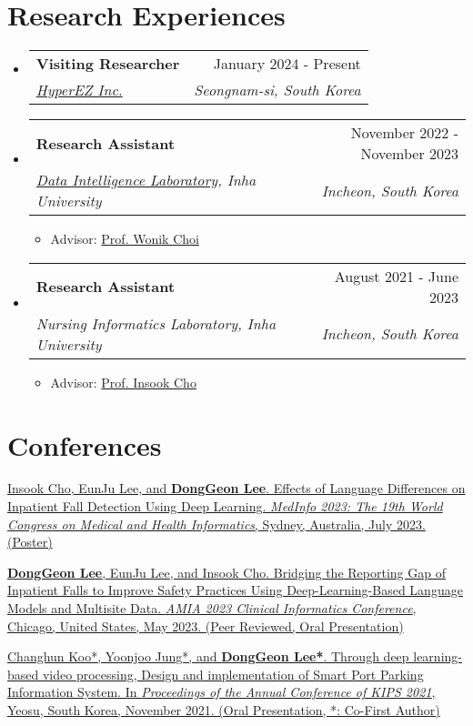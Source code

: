 \documentclass[letterpaper,11pt]{article}
\makeatletter
\newcommand{\resumeSubheading}[4]{
  \vspace{-1pt}\item
    \begin{tabular*}{0.97\textwidth}{l@{\extracolsep{\fill}}r}
      #1 & #2 \\
      \textit{\small#3} & \textit{\small #4} \\
    \end{tabular*}\vspace{-5pt}
}
\makeatother
\begin{document}
    \section{Research Experiences}
    \begin{itemize}[leftmargin=*,label=]
        \resumeSubheading
        {\textbf{Visiting Researcher}}{January 2024 - Present}
            {\href{https://www.hyperez.io/?lang=en}{HyperEZ Inc.}}{Seongnam-si, South Korea}
        \resumeSubheading
        {\textbf{Research Assistant} }{November 2022 - November 2023}
            {\href{http://dilab.inha.ac.kr/}{Data Intelligence Laboratory}, Inha University}{Incheon, South Korea}
            \begin{itemize}[label=\bullet]
                \item{Advisor: \href{http://bit.ly/3zSrQ8F}{Prof. Wonik Choi}}
            \end{itemize}
        \resumeSubheading
        {\textbf{Research Assistant}}{August 2021 - June 2023}
            {Nursing Informatics Laboratory, Inha University}{Incheon, South Korea}
            \begin{itemize}[label=\bullet]
                \item{Advisor: \href{http://bit.ly/412nYOw}{Prof. Insook Cho}}
            \end{itemize}
    \end{itemize}

        
    \section{Conferences}
    \begin{enumerate}[noitemsep, leftmargin=*,label={[\arabic*]}]
        \item \href{https://bit.ly/medinfo2023poster}{Insook Cho, EunJu Lee, and \textbf{DongGeon Lee}. Effects of Language Differences on Inpatient Fall Detection Using Deep Learning. \textit{MedInfo 2023: The 19th World Congress on Medical and Health Informatics}, Sydney, Australia, July 2023. (Poster)}
        
        \item \href{https://bit.ly/cic23abstract}{\textbf{DongGeon Lee}, EunJu Lee, and Insook Cho. Bridging the Reporting Gap of Inpatient Falls to Improve Safety Practices Using Deep-Learning-Based Language Models and Multisite Data. \textit{AMIA 2023 Clinical Informatics Conference}, Chicago, United States, May 2023. (Peer Reviewed, Oral Presentation)}
        
        \item {\href{https://doi.org/10.3745/PKIPS.y2021m11a.1342}{Changhun Koo*, Yoonjoo Jung*, and \textbf{DongGeon Lee*}. Through deep learning-based video processing, Design and implementation of Smart Port Parking Information System. In \textit{Proceedings of the Annual Conference of KIPS 2021}, Yeosu, South Korea, November 2021. (Oral Presentation, *: Co-First Author)}}
    \end{enumerate}
\end{document}
